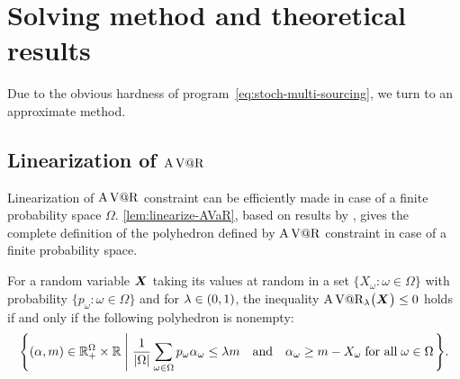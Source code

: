 \section{Solving method and theoretical results}
\label{sec:multi-sourcing:stochastic:solving-method}


Due to the obvious hardness of program~\eqref{eq:stoch-multi-sourcing}, we turn to an approximate method.


\subsection{Linearization of $\operatorname{A\operatorname{V@R}}$}
\label{sec:multi-sourcing:stochastic:avar-linearization}


Linearization of $\operatorname{A\operatorname{V@R}}$ constraint can be efficiently made in case of a finite probability space $\Omega$.
\cref{lem:linearize-AVaR}, based on results by \cite{Rockafellar2000}, gives the complete definition of the polyhedron defined by $\operatorname{A\operatorname{V@R}}$ constraint in case of a finite probability space.


\begin{lem}\label{lem:linearize-AVaR}
For a random variable $\va X$ taking its values at random in a set $\{X_{\omega}\colon\omega\in\Omega\}$ with probability $\{p_{\omega}\colon\omega\in\Omega\}$ and for $\lambda\in\bracket{0,1}$, the inequality 
$\AVaR_{\lambda}\bracket{\va X} \le 0$ holds if and only if the following polyhedron is nonempty:
$$
\left\{
\bracket{\alpha,m}\in\RR_+^{\Omega}\times\RR
\;\left|\;
\frac{1}{\card{\Omega}}\sum_{\omega\in\Omega}p_{\omega}\alpha_{\omega}\leq \lambda m
\quad\mbox{\textup{and}}\quad
\alpha_{\omega}\geq m-X_{\omega}\;
\mbox{\textup{for all}}\;\omega\in\Omega
\right.
\right\}.
$$
\end{lem}


